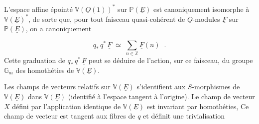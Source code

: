 \begin{center}
\end{center}
L'espace affine \'epoint\'e $\mathbb{V}(\underline{O}(1))^*$ sur $\mathbb{P}(\underline{E})$ est canoniquement isomorphe \`a $\mathbb{V}(\underline{E})^*$, de sorte que, pour tout faisceau quasi-coh\'erent de $\underline{O}$-modules $\underline{F}$ sur $\mathbb{P}(\underline{E})$, on a canoniquement 



\begin{equation}\tag{1.1.1}
q_* \, q^* \, \underline{F} \;\simeq\; \sum_{n \in \mathbb{Z}} \underline{F}(n) \;\; .
\end{equation}
Cette graduation de $q_* \, q^* \, \underline{F}$ peut se déduire de l'action, sur ce faisceau, du groupe $\mathbb{G}_m$ des homothéties de $\mathbb{V}(\underline{E})$.

Les champs de vecteurs relatifs sur $\mathbb{V}(\underline{E})$ s'identifient aux $S$-morphismes de $\mathbb{V}(\underline{E})$ dans $\mathbb{V}(\underline{E})$ (identifié à l'espace tangent à l'origine). Le champ de vecteur $X$ défini par l'application identique de $\mathbb{V}(\underline{E})$ est invariant par homothéties, Ce champ de vecteur est tangent aux fibres de $q$ et définit une trivialisation

